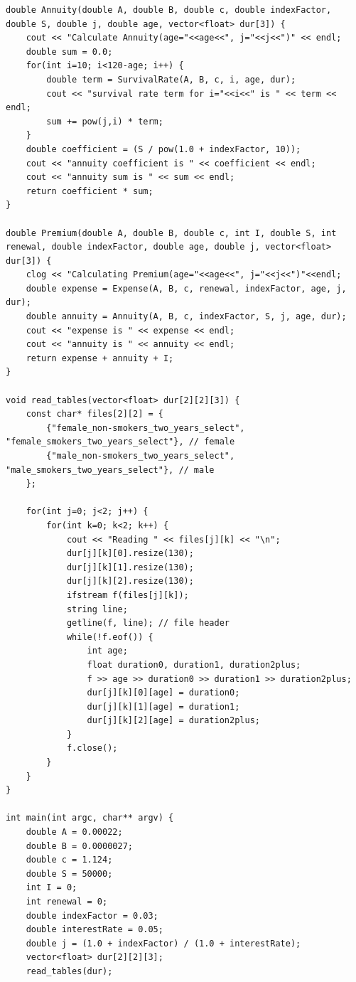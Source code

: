 \documentclass{report}
\begin{document}
\begin{verbatim}
double Annuity(double A, double B, double c, double indexFactor, double S, double j, double age, vector<float> dur[3]) {
    cout << "Calculate Annuity(age="<<age<<", j="<<j<<")" << endl;
    double sum = 0.0;
    for(int i=10; i<120-age; i++) {
        double term = SurvivalRate(A, B, c, i, age, dur);
        cout << "survival rate term for i="<<i<<" is " << term << endl;
        sum += pow(j,i) * term;
    }
    double coefficient = (S / pow(1.0 + indexFactor, 10));
    cout << "annuity coefficient is " << coefficient << endl;
    cout << "annuity sum is " << sum << endl;
    return coefficient * sum;
}

double Premium(double A, double B, double c, int I, double S, int renewal, double indexFactor, double age, double j, vector<float> dur[3]) {
    clog << "Calculating Premium(age="<<age<<", j="<<j<<")"<<endl;
    double expense = Expense(A, B, c, renewal, indexFactor, age, j, dur);
    double annuity = Annuity(A, B, c, indexFactor, S, j, age, dur);
    cout << "expense is " << expense << endl;
    cout << "annuity is " << annuity << endl;
	return expense + annuity + I;
}

void read_tables(vector<float> dur[2][2][3]) {
    const char* files[2][2] = {
        {"female_non-smokers_two_years_select", "female_smokers_two_years_select"}, // female
        {"male_non-smokers_two_years_select", "male_smokers_two_years_select"}, // male
    };

    for(int j=0; j<2; j++) {
        for(int k=0; k<2; k++) {
            cout << "Reading " << files[j][k] << "\n";
            dur[j][k][0].resize(130);
            dur[j][k][1].resize(130);
            dur[j][k][2].resize(130);
            ifstream f(files[j][k]);
            string line;
            getline(f, line); // file header
            while(!f.eof()) {
                int age;
                float duration0, duration1, duration2plus;
                f >> age >> duration0 >> duration1 >> duration2plus;
                dur[j][k][0][age] = duration0;
                dur[j][k][1][age] = duration1;
                dur[j][k][2][age] = duration2plus;
            }
            f.close();
        }
    }
}

int main(int argc, char** argv) {
    double A = 0.00022;
    double B = 0.0000027;
    double c = 1.124;
    double S = 50000;
	int I = 0;
	int renewal = 0;
	double indexFactor = 0.03;
    double interestRate = 0.05;
	double j = (1.0 + indexFactor) / (1.0 + interestRate);
    vector<float> dur[2][2][3];
    read_tables(dur);


\end{verbatim}
\end{document}
